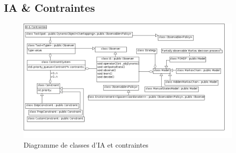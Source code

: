 \subsection{IA \& Contraintes}
\begin{figure}[!h]\centering
   \includegraphics[scale=0.5]{images/c_ia_contraintes.png}
   \caption{\label{c_ia_contraintes} Diagramme de classes d'IA et contraintes}
\end{figure}

